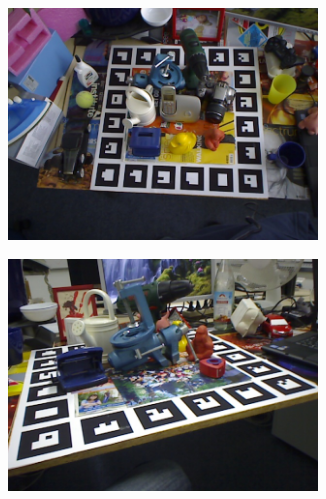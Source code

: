 \documentclass[../main.tex]{subfiles}
\begin{document}
\begin{figure}[H]
    \centering
    \begin{subfigure}[t]{0.24\textwidth}
        \centering
        \captionsetup{width=.9\textwidth}
        \includegraphics[width=0.9\textwidth]{figures/linemod/example01.png}
        \label{subfig:linemod_example01}
    \end{subfigure}
    \begin{subfigure}[t]{0.24\textwidth}
        \centering
        \captionsetup{width=.9\textwidth}
        \includegraphics[width=0.9\textwidth]{figures/linemod/example02.png}
        \label{subfig:linemod_example02}
    \end{subfigure}
    \begin{subfigure}[t]{0.24\textwidth}
        \centering
        \captionsetup{width=.9\textwidth}

\end{subfigure}
\end{figure}
\end{document}
